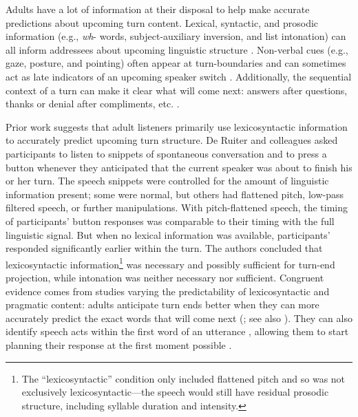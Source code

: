 \documentclass[authoryear, 12pt]{elsarticle}
\begin{document}
Adults have a lot of information at their disposal to help make accurate predictions about upcoming turn content. Lexical, syntactic, and prosodic information (e.g., \textit{wh}- words, subject-auxiliary inversion, and list intonation) can all inform addressees about upcoming linguistic structure \citep{de-ruiter2006, duncan1972, ford1996, torreira2015}. Non-verbal cues (e.g., gaze, posture, and pointing) often appear at turn-boundaries and can sometimes act as late indicators of an upcoming speaker switch \citep{rossano2009, stivers2010}. Additionally, the sequential context of a turn can make it clear what will come next: answers after questions, thanks or denial after compliments, etc. \citep{schegloff2007}.

Prior work suggests that adult listeners primarily use lexicosyntactic information to accurately predict upcoming turn structure. De Ruiter and colleagues \citeyearpar{de-ruiter2006} asked participants to listen to snippets of spontaneous conversation and to press a button whenever they anticipated that the current speaker was about to finish his or her turn. The speech snippets were controlled for the amount of linguistic information present; some were normal, but others had flattened pitch, low-pass filtered speech, or further manipulations. With pitch-flattened speech, the timing of participants' button responses was comparable to their timing with the full linguistic signal. But when no lexical information was available, participants' responded significantly earlier within the turn. The authors concluded that lexicosyntactic information\footnote{The ``lexicosyntactic'' condition only included flattened pitch and so was not exclusively lexicosyntactic---the speech would still have residual prosodic structure, including syllable duration and intensity.} was necessary and possibly sufficient for turn-end projection, while intonation was neither necessary nor sufficient. Congruent evidence comes from studies varying the predictability of lexicosyntactic and pragmatic content: adults anticipate turn ends better when they can more accurately predict the exact words that will come next (\citealp{magyari2012}; see also \citealp{magyari2014}). They can also identify speech acts within the first word of an utterance \citep{gisladottir2015}, allowing them to start planning their response at the first moment possible \citep{bogels2015}.
\end{document}
